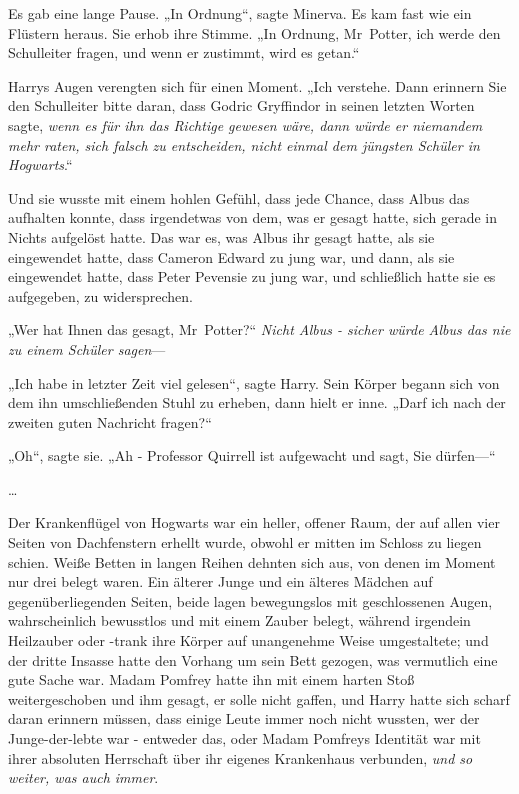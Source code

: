 {Es gab eine lange Pause. „In Ordnung“, sagte Minerva. Es kam fast wie ein Flüstern heraus. Sie erhob ihre Stimme. „In Ordnung, Mr~Potter, ich werde den Schulleiter fragen, und wenn er zustimmt, wird es getan.“

Harrys Augen verengten sich für einen Moment. „Ich verstehe. Dann erinnern Sie den Schulleiter bitte daran, dass Godric Gryffindor in seinen letzten Worten sagte, \emph{wenn es für ihn das Richtige gewesen wäre, dann würde er niemandem mehr raten, sich falsch zu entscheiden, nicht einmal dem jüngsten Schüler in Hogwarts}.“

Und sie wusste mit einem hohlen Gefühl, dass jede Chance, dass Albus das aufhalten konnte, dass irgendetwas von dem, was er gesagt hatte, sich gerade in Nichts aufgelöst hatte. Das war es, was Albus ihr gesagt hatte, als sie eingewendet hatte, dass Cameron Edward zu jung war, und dann, als sie eingewendet hatte, dass Peter Pevensie zu jung war, und schließlich hatte sie es aufgegeben, zu widersprechen.

„Wer hat Ihnen das gesagt, Mr~Potter?“ \emph{Nicht Albus - sicher würde Albus das nie zu einem Schüler sagen}—

„Ich habe in letzter Zeit viel gelesen“, sagte Harry. Sein Körper begann sich von dem ihn umschließenden Stuhl zu erheben, dann hielt er inne. „Darf ich nach der zweiten guten Nachricht fragen?“

„Oh“, sagte sie. „Ah - Professor Quirrell ist aufgewacht und sagt, Sie dürfen—“

…

Der Krankenflügel von Hogwarts war ein heller, offener Raum, der auf allen vier Seiten von Dachfenstern erhellt wurde, obwohl er mitten im Schloss zu liegen schien. Weiße Betten in langen Reihen dehnten sich aus, von denen im Moment nur drei belegt waren. Ein älterer Junge und ein älteres Mädchen auf gegenüberliegenden Seiten, beide lagen bewegungslos mit geschlossenen Augen, wahrscheinlich bewusstlos und mit einem Zauber belegt, während irgendein Heilzauber oder -trank ihre Körper auf unangenehme Weise umgestaltete; und der dritte Insasse hatte den Vorhang um sein Bett gezogen, was vermutlich eine gute Sache war. Madam Pomfrey hatte ihn mit einem harten Stoß weitergeschoben und ihm gesagt, er solle nicht gaffen, und Harry hatte sich scharf daran erinnern müssen, dass einige Leute immer noch nicht wussten, wer der Junge-der-lebte war - entweder das, oder Madam Pomfreys Identität war mit ihrer absoluten Herrschaft über ihr eigenes Krankenhaus verbunden, \emph{und so weiter, was auch immer}.

}
